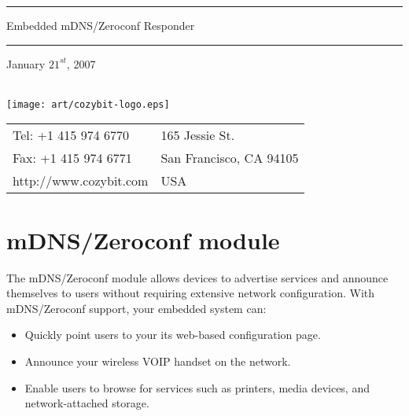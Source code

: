 \documentclass[11pt,titlepage]{article}
\begin{document}
\begin{titlepage}
\lstset{language=c}
\newcommand\HRule{\noindent\rule{\linewidth}{1.5pt}}
\HRule
\begin{center}
	\LARGE Embedded mDNS/Zeroconf Responder
\end{center}
\HRule
{}
\vspace{1in}
\begin{center}
	\Large
{\small January $21^{st}$, 2007}\\
\rule{0pt}{20ex}\\
\texttt{[image: art/cozybit-logo.eps]}\\
\vspace{3ex}
{\scriptsize 
\begin{tabular}{l l}
Tel: +1 415 974 6770 	& 165 Jessie St. \\
Fax: +1 415 974 6771    & San Francisco, CA 94105 \\
http://www.cozybit.com  & USA \\
\end{tabular}}
\end{center}
\end{titlepage}
\clearpage


\section{mDNS/Zeroconf module}

The mDNS/Zeroconf module allows devices to advertise services and announce 
themselves to users without requiring extensive network configuration.  With 
mDNS/Zeroconf support, your embedded system can:

\begin{itemize}
	\item Quickly point users to your its web-based configuration page.
	\item Announce your wireless VOIP handset on the network.
	\item Enable users to browse for services such as printers, media
		  devices, and network-attached storage.
\end{itemize}
\end{document}
